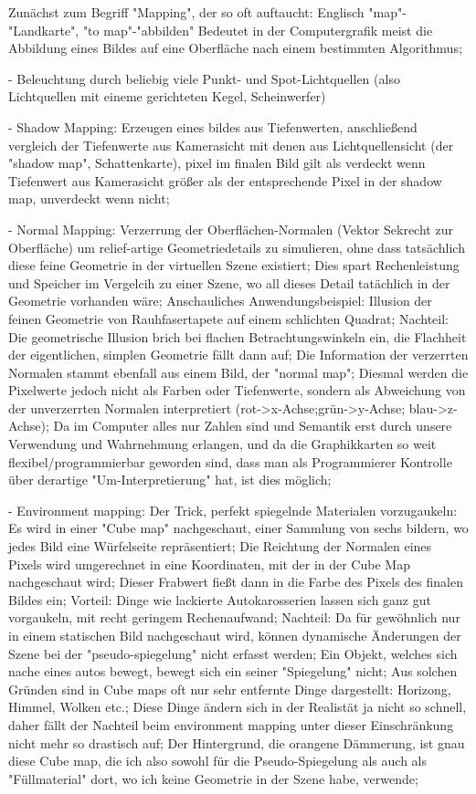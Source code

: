 Zunächst zum Begriff "Mapping", der so oft auftaucht: Englisch "map"-"Landkarte", "to map"-"abbilden" Bedeutet in der Computergrafik meist die Abbildung eines Bildes auf eine Oberfläche nach einem bestimmten Algorithmus;

- Beleuchtung durch beliebig viele Punkt- und Spot-Lichtquellen (also Lichtquellen mit eineme gerichteten Kegel, Scheinwerfer)

- Shadow Mapping: Erzeugen eines bildes aus Tiefenwerten, anschließend vergleich der Tiefenwerte aus Kamerasicht mit denen aus Lichtquellensicht (der "shadow map", Schattenkarte), pixel im finalen Bild gilt als verdeckt wenn Tiefenwert aus Kamerasicht größer als der entsprechende Pixel in der shadow map, unverdeckt wenn nicht;

- Normal Mapping: Verzerrung der Oberflächen-Normalen (Vektor Sekrecht zur Oberfläche) um relief-artige Geometriedetails zu simulieren, ohne dass tatsächlich diese feine Geometrie in der virtuellen Szene existiert; Dies spart Rechenleistung und Speicher im Vergelcih zu einer Szene, wo all dieses Detail tatächlich in der Geometrie vorhanden wäre; Anschauliches Anwendungsbeispiel: Illusion der feinen Geometrie von Rauhfasertapete auf einem schlichten Quadrat; Nachteil: Die geometrische Illusion brich bei flachen Betrachtungswinkeln ein, die Flachheit der eigentlichen, simplen Geometrie fällt dann auf; Die Information der verzerrten Normalen stammt ebenfall aus einem Bild, der "normal map"; Diesmal werden die Pixelwerte jedoch nicht als Farben oder Tiefenwerte, sondern als Abweichung von der unverzerrten Normalen interpretiert (rot->x-Achse;grün->y-Achse; blau->z-Achse); Da im Computer alles nur Zahlen sind und Semantik erst durch unsere Verwendung und Wahrnehmung erlangen, und da die Graphikkarten so weit flexibel/programmierbar geworden sind, dass man als Programmierer Kontrolle über derartige "Um-Interpretierung" hat, ist dies möglich;

- Environment mapping: Der Trick, perfekt spiegelnde Materialen vorzugaukeln: Es wird in einer "Cube map" nachgeschaut, einer Sammlung von sechs bildern, wo jedes Bild eine Würfelseite repräsentiert; Die Reichtung der Normalen eines Pixels wird umgerechnet in eine Koordinaten, mit der in der Cube Map nachgeschaut wird; Dieser Frabwert fießt dann in die Farbe des Pixels des finalen Bildes ein; Vorteil: Dinge wie lackierte Autokarosserien lassen sich ganz gut vorgaukeln, mit recht geringem Rechenaufwand; Nachteil: Da für gewöhnlich nur in einem statischen Bild nachgeschaut wird, können dynamische Änderungen der Szene bei der "pseudo-spiegelung" nicht erfasst werden; Ein Objekt, welches sich nache eines autos bewegt, bewegt sich ein seiner "Spiegelung" nicht; Aus solchen Gründen sind in Cube maps oft nur sehr entfernte Dinge dargestellt: Horizong, Himmel, Wolken etc.; Diese Dinge ändern sich in der Realistät ja nicht so schnell, daher fällt der Nachteil beim environment mapping unter dieser Einschränkung nicht mehr so drastisch auf; Der Hintergrund, die orangene Dämmerung, ist gnau diese Cube map, die ich also sowohl für die Pseudo-Spiegelung als auch als "Füllmaterial" dort, wo ich keine Geometrie in der Szene habe, verwende;

